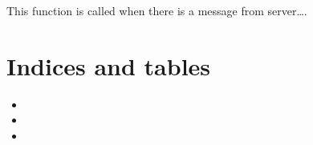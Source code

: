 \documentclass[letterpaper,10pt,english]{sphinxmanual}
\begin{document}

\begin{fulllineitems}
\label{\detokenize{app:app.handleMessageFromServer}}
This function is called when there is a message from server….

\end{fulllineitems}



\chapter{Indices and tables}
\label{\detokenize{index:indices-and-tables}}\begin{itemize}
\item {} 

\item {} 

\item {} 

\end{itemize}


\renewcommand{\indexname}{Python Module Index}
\begin{sphinxtheindex}
\let\bigletter\sphinxstyleindexlettergroup
\bigletter{a}
\item\relax{}
\indexspace
\bigletter{m}
\item\relax{}
\end{sphinxtheindex}

\renewcommand{\indexname}{Index}
\printindex
\end{document}
